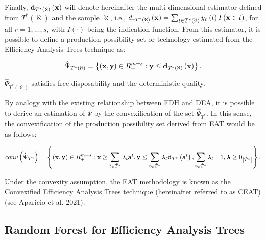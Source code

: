 Finally, \({\it \textbf{d}}_{T^{*} \left(\aleph \right)} \left({\it \textbf{x}}\right)\) will denote hereinafter the multi-dimensional estimator defined from \(T^{*} \left(\aleph \right)\) and the sample \(\aleph\), i.e., \(d_{rT^{*} \left(\aleph \right)} \left({\it \textbf{x}}\right)=\sum _{t\in T^{*} \left(\aleph \right)}y_{r} \left(t\right)I\left({\it \textbf{x}}\in t\right)\), for all \(r=1,...,s\), with \(I\left(\cdot \right)\) being the indication function. From this estimator, it is possible to define a production possibility set or technology estimated from the Efficiency Analysis Trees technique as:

\begin{equation} \label{(4)} 
\hat{\Psi}_{T^{*} (\aleph)} =\left\{\left({\it \textbf{x}},{\it \textbf{y}}\right)\in R_{+}^{m+s} :{\it \textbf{y}}\le {\it \textbf{d}}_{T^{*} \left(\aleph \right)} \left({\it \textbf{x}}\right)\right\}. 
\end{equation}

\(\hat{\Psi }_{T^{*} \left(\aleph \right)}\) satisfies free disposability and the deterministic quality.

By analogy with the existing relationship between FDH and DEA, it is possible to derive an estimation of \(\Psi\) by the convexification of the set \(\hat{\Psi }_{T^{*}}\). In this sense, the convexification of the production possibility set derived from EAT would be as follows:

\begin{equation} \label{(5)} 
conv\left(\hat{\Psi}_{T^{*} } \right)=\left\{\left({\it \textbf{x}},{\it \textbf{y}}\right)\in R_{+}^{m+s} :{\it \textbf{x}}\ge \sum _{t\in \tilde{T}^{*} }^{}\lambda _{t} {\it \textbf{a}}^{t}  ,{\it \textbf{y}}\le \sum _{t\in \tilde{T}^{*} }^{}\lambda _{t} {\it \textbf{d}}_{T^{*} } \left({\it \textbf{a}}^{t} \right) ,\sum _{t\in \tilde{T}^{*} }^{}\lambda_{t}  {\rm =1}{\it ,\boldsymbol{\lambda}}\ge 0_{\left|\tilde{T}^{*} \right|} \right\}. 
\end{equation}

Under the convexity assumption, the EAT methodology is known as the Convexified Efficiency Analysis Trees technique (hereinafter referred to as CEAT) (see Aparicio et al. 2021).

\hypertarget{section2.2}{%
\subsection{Random Forest for Efficiency Analysis Trees}\label{section2.2}}

